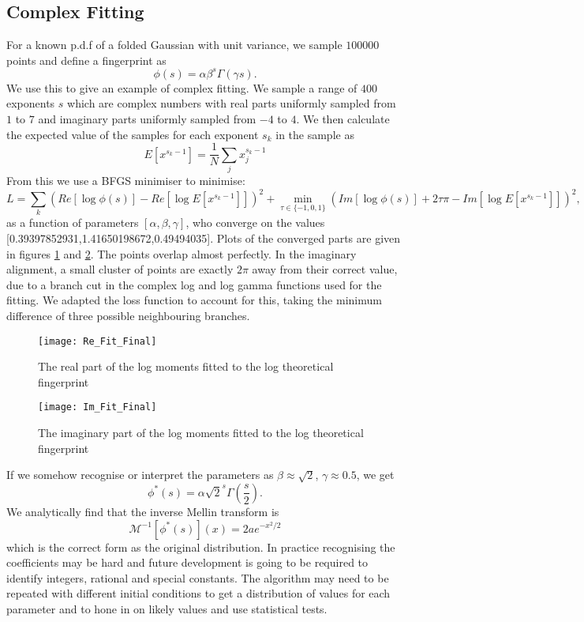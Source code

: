 \documentclass{article}
\begin{document}
\subsection{Complex Fitting}
For a known p.d.f of a folded Gaussian with unit variance, we sample $100000$ points and define a fingerprint as
\begin{equation}
\phi(s) = \alpha \beta^s \Gamma(\gamma s).
\end{equation}
We use this to give an example of complex fitting. We sample a range of $400$ exponents $s$ which are complex numbers with real parts uniformly sampled from $1$ to $7$ and imaginary parts uniformly sampled from $-4$ to $4$. We then calculate the expected value of the samples for each exponent $s_k$ in the sample as 
$$
E[x^{s_k-1}] = \frac{1}{N}\sum_j x_j^{s_k-1}
$$
From this we use a BFGS minimiser to minimise:
\begin{equation}
L = \sum_k (Re[\log\phi(s)]-Re[\log E[x^{s_k-1}]])^2 + \min_{\tau \in \{-1,0,1\}}(Im[\log\phi(s)]+2\tau \pi -Im[\log E[x^{s_k-1}]])^2,
\end{equation}
as a function of parameters $[\alpha,\beta,\gamma]$, who converge on the values [0.39397852931,1.41650198672,0.49494035]. Plots of the converged parts are given in figures \ref{fig:A} and \ref{fig:B}. The points overlap almost perfectly. In the imaginary alignment, a small cluster of points are exactly $2 \pi$ away from their correct value, due to a branch cut in the complex log and log gamma functions used for the fitting. We adapted the loss function to account for this, taking the minimum difference of three possible neighbouring branches.\\


\begin{figure}[h!]
\texttt{[image: Re\_Fit\_Final]}
\caption{The real part of the log moments fitted to the log theoretical fingerprint}
\label{fig:A}
\end{figure}

\begin{figure}[h!]
\texttt{[image: Im\_Fit\_Final]}
\caption{The imaginary part of the log moments fitted to the log theoretical fingerprint}
\label{fig:B}
\end{figure}

If we somehow recognise or interpret the parameters as $\beta \approx \sqrt{2}$, $\gamma \approx 0.5$, we get
$$
\phi^*(s) = \alpha \sqrt{2}^s \Gamma\left(\frac{s}{2}\right).
$$
We analytically find that the inverse Mellin transform is
$$
\mathcal{M}^{-1}[\phi^*(s)](x) = 2ae^{-x^2/2}
$$
which is the correct form as the original distribution. In practice recognising the coefficients may be hard and future development is going to be required to identify integers, rational and special constants. The algorithm may need to be repeated with different initial conditions to get a distribution of values for each parameter and to hone in on likely values and use statistical tests.\\
\end{document}
